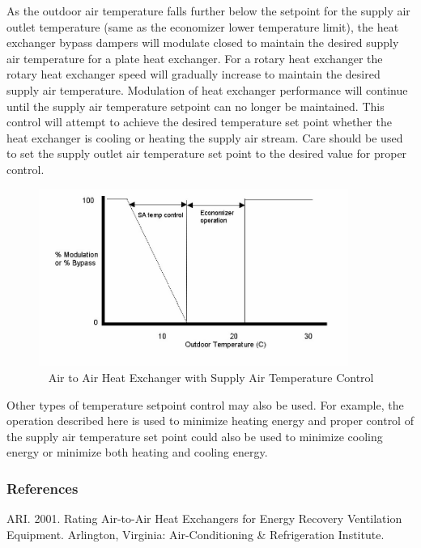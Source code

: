 As the outdoor air temperature falls further below the setpoint for the supply air outlet temperature (same as the economizer lower temperature limit), the heat exchanger bypass dampers will modulate closed to maintain the desired supply air temperature for a plate heat exchanger. For a rotary heat exchanger the rotary heat exchanger speed will gradually increase to maintain the desired supply air temperature. Modulation of heat exchanger performance will continue until the supply air temperature setpoint can no longer be maintained. This control will attempt to achieve the desired temperature set point whether the heat exchanger is cooling or heating the supply air stream. Care should be used to set the supply outlet air temperature set point to the desired value for proper control.

\begin{figure}[hbtp] %
\centering
\includegraphics[width=0.9\textwidth, height=0.9\textheight, keepaspectratio=true]{media/image5550.png}
\caption{  Air to Air Heat Exchanger with Supply Air Temperature Control \protect \label{fig:air-to-air-heat-exchanger-with-supply-air}}
\end{figure}

Other types of temperature setpoint control may also be used. For example, the operation described here is used to minimize heating energy and proper control of the supply air temperature set point could also be used to minimize cooling energy or minimize both heating and cooling energy.

\subsubsection{References}\label{references-027}

ARI. 2001. Rating Air-to-Air Heat Exchangers for Energy Recovery Ventilation Equipment. Arlington, Virginia: Air-Conditioning \& Refrigeration Institute.

